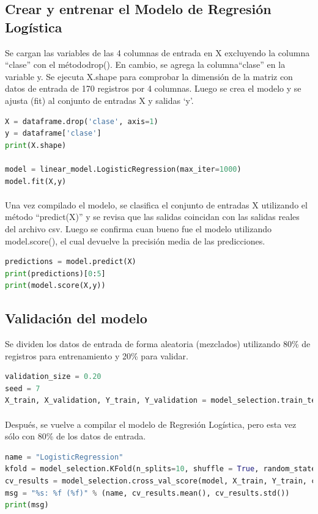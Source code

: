 \documentclass{article}
\begin{document}
\newpage
\subsection{Crear y entrenar el Modelo de Regresión Logística} Se cargan las variables de las 4 columnas de entrada en X excluyendo la columna “clase” con el métododrop(). En cambio, se agrega la columna“clase” en la variable y. Se ejecuta X.shape para comprobar la dimensión de la matriz con datos de entrada de 170 registros por 4 columnas. Luego se crea el modelo y se ajusta (fit) al conjunto de entradas X y salidas ‘y’.
\begin{lstlisting}[language=Python]
X = dataframe.drop('clase', axis=1)
y = dataframe['clase']
print(X.shape)

model = linear_model.LogisticRegression(max_iter=1000)
model.fit(X,y)
\end{lstlisting}

\paragraph{}Una vez compilado el modelo, se clasifica el conjunto de entradas X utilizando el método “predict(X)” y se revisa que las salidas coincidan con las salidas reales del archivo csv. Luego se confirma cuan bueno fue el modelo utilizando model.score(), el cual devuelve la precisión media de las predicciones.
\begin{lstlisting}[language=Python]
predictions = model.predict(X)
print(predictions)[0:5]
print(model.score(X,y))
\end{lstlisting}

\subsection{Validación del modelo}Se dividen los datos de entrada de
 forma aleatoria (mezclados) utilizando 80\% de registros para entrenamiento y 20\% para validar.
\begin{lstlisting}[language=Python]
validation_size = 0.20
seed = 7
X_train, X_validation, Y_train, Y_validation = model_selection.train_test_split(X, y, test_size=validation_size, random_state=seed)
\end{lstlisting}

\paragraph{}Después, se vuelve a compilar el modelo de Regresión Logística, pero esta vez sólo con 80\% de los datos de entrada.
\begin{lstlisting}[language=Python]
name = "LogisticRegression"
kfold = model_selection.KFold(n_splits=10, shuffle = True, random_state=seed)
cv_results = model_selection.cross_val_score(model, X_train, Y_train, cv=kfold, scoring="accuracy")
msg = "%s: %f (%f)" % (name, cv_results.mean(), cv_results.std())
print(msg)
\end{lstlisting}
\end{document}

